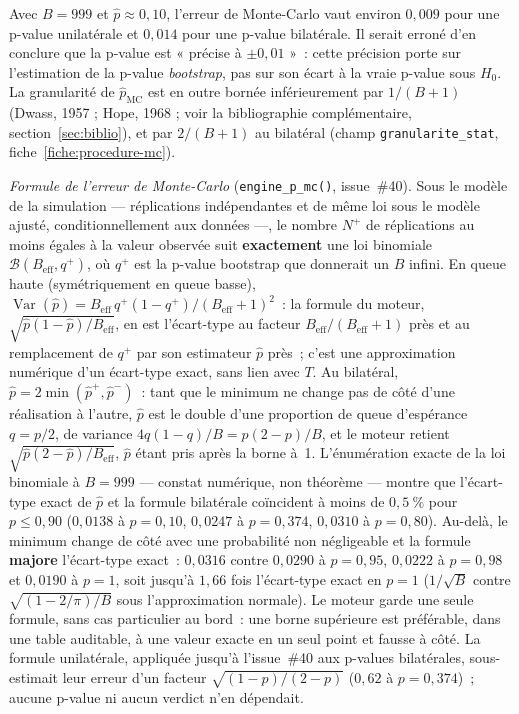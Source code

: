 \documentclass[a4paper,11pt]{article}
\newcommand{\code}[1]{\texttt{\small #1}}
\begin{document}
Avec $B = 999$ et $\hat p \approx 0{,}10$, l'erreur de Monte-Carlo vaut environ
$0{,}009$ pour une p-value unilatérale et $0{,}014$ pour une p-value bilatérale. Il serait erroné d'en conclure que la p-value est « précise à
$\pm 0{,}01$ »~: cette précision porte sur l'estimation de la p-value
\emph{bootstrap}, pas sur son écart à la vraie p-value sous $H_0$. La granularité
de $\hat p_{\text{MC}}$ est en outre bornée inférieurement par $1/(B+1)$
(Dwass, 1957 ; Hope, 1968 ; voir la bibliographie complémentaire, section~\ref{sec:biblio}),
et par $2/(B+1)$ au bilatéral (champ \code{granularite\_stat}, fiche~\ref{fiche:procedure-mc}).

\emph{Formule de l'erreur de Monte-Carlo} (\code{engine\_p\_mc()}, issue~\#40). Sous le modèle
de la simulation --- réplications indépendantes et de même loi sous le modèle ajusté,
conditionnellement aux données ---, le nombre $N^{+}$ de réplications au moins égales à la valeur
observée suit \textbf{exactement} une loi binomiale $\mathcal{B}(B_{\text{eff}}, q^{+})$, où $q^{+}$
est la p-value bootstrap que donnerait un $B$ infini. En queue haute (symétriquement en queue
basse), $\operatorname{Var}(\hat p) = B_{\text{eff}}\,q^{+}(1-q^{+})/(B_{\text{eff}}+1)^2$~: la
formule du moteur, $\sqrt{\hat p(1-\hat p)/B_{\text{eff}}}$, en est l'écart-type au facteur
$B_{\text{eff}}/(B_{\text{eff}}+1)$ près et au remplacement de $q^{+}$ par son estimateur
$\hat p$ près~; c'est une approximation numérique d'un écart-type exact, sans lien avec $T$. Au
bilatéral, $\hat p = 2\min(\hat p^{+}, \hat p^{-})$~: tant que le minimum ne change pas de côté
d'une réalisation à l'autre, $\hat p$ est le double d'une proportion de queue d'espérance
$q = p/2$, de variance $4q(1-q)/B = p(2-p)/B$, et le moteur retient
$\sqrt{\hat p(2-\hat p)/B_{\text{eff}}}$, $\hat p$ étant pris après la borne à~1. L'énumération
exacte de la loi binomiale à $B = 999$ --- constat numérique, non théorème --- montre que
l'écart-type exact de $\hat p$ et la formule bilatérale coïncident à moins de $0{,}5~\%$ pour
$p \le 0{,}90$ ($0{,}0138$ à $p = 0{,}10$, $0{,}0247$ à $p = 0{,}374$, $0{,}0310$ à $p = 0{,}80$).
Au-delà, le minimum change de côté avec une probabilité non négligeable et la formule
\textbf{majore} l'écart-type exact~: $0{,}0316$ contre $0{,}0290$ à $p = 0{,}95$, $0{,}0222$ à
$p = 0{,}98$ et $0{,}0190$ à $p = 1$, soit jusqu'à $1{,}66$ fois l'écart-type exact en $p = 1$
($1/\sqrt{B}$ contre $\sqrt{(1-2/\pi)/B}$ sous l'approximation normale). Le moteur garde une
seule formule, sans cas particulier au bord~: une borne supérieure est préférable, dans une table
auditable, à une valeur exacte en un seul point et fausse à côté. La formule unilatérale,
appliquée jusqu'à l'issue~\#40 aux p-values bilatérales, sous-estimait leur erreur d'un facteur
$\sqrt{(1-p)/(2-p)}$ ($0{,}62$ à $p = 0{,}374$)~; aucune p-value ni aucun verdict n'en dépendait.
\end{document}
